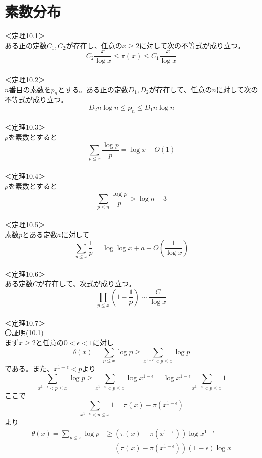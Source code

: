 \documentclass{jsarticle}
\begin{document}
\section{素数分布}
\noindent
＜定理10.1＞\\
ある正の定数\(C_{1},C_{2}\)が存在し、任意の\(x\geq2\)に対して次の不等式が成り立つ。
\begin{equation}
C_{2}\frac{x}{\log x}\leq\pi(x)\leq C_{1}\frac{x}{\log x}
\end{equation}
\\
＜定理10.2＞\\
\(n\)番目の素数を\(p_{n}\)とする。ある正の定数\(D_{1},D_{2}\)が存在して、任意の\(n\)に対して次の不等式が成り立つ。
\begin{equation}
D_{2}n\log n\leq p_{n}\leq D_{1}n\log n
\end{equation}
\\
＜定理10.3＞\\
\(p\)を素数とすると
\begin{equation}
\sum_{p\leq x}\frac{\log p}{p}=\log x+O(1)
\end{equation}
\\
＜定理10.4＞\\
\(p\)を素数とすると
\begin{equation}
\sum_{p\leq n}\frac{\log p}{p}>\log n-3
\end{equation}
\\
＜定理10.5＞\\
素数\(p\)とある定数\(a\)に対して
\begin{equation}
\sum_{p\leq x}\frac{1}{p}=\log\log x+a+O\left(\frac{1}{\log x}\right)
\end{equation}
\\
＜定理10.6＞\\
ある定数\(C\)が存在して、次式が成り立つ。
\begin{equation}
\prod_{p\leq x}\left(1-\frac{1}{p}\right)\sim\frac{C}{\log x}
\end{equation}
\\
＜定理10.7＞\\
\newpage
〇証明(10.1)\\
まず\(x\geq 2\)と任意の\(0<\epsilon<1\)に対し
\[\theta(x)=\sum_{p\leq x}\log p\geq\sum_{x^{1-\epsilon}<p\leq x}\log p\]
である。また、\(x^{1-\epsilon}<p\)より
\[\sum_{x^{1-\epsilon}<p\leq x}\log p\geq\sum_{x^{1-\epsilon}<p\leq x}\log x^{1-\epsilon}=\log x^{1-\epsilon}\sum_{x^{1-\epsilon}<p\leq x}1\]
ここで
\[\sum_{x^{1-\epsilon}<p\leq x}1=\pi(x)-\pi(x^{1-\epsilon})\]
より
\begin{align*}
\theta(x)=\sum_{p\leq x}\log p&\geq\left(\pi(x)-\pi(x^{1-\epsilon})\right)\log x^{1-\epsilon}\\
&=\left(\pi(x)-\pi(x^{1-\epsilon})\right)(1-\epsilon)\log x
\end{align*}
\end{document}
